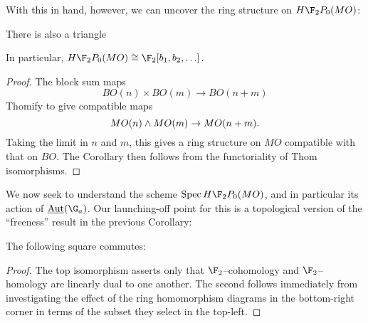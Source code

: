 With this in hand, however, we can uncover the ring structure on $H\F_2P_0(MO)$:
\begin{corollary}\label{HF2MOisFree}
There is also a triangle
\begin{center}
\end{center}
In particular, $H\F_2P_0(MO) \cong \F_2[b_1, b_2, \ldots]$.
\end{corollary}
\begin{proof}
The block sum maps \[BO(n) \times BO(m) \to BO(n+m)\] Thomify to give compatible maps \[MO(n) \wedge MO(m) \to MO(n+m).\]  Taking the limit in $n$ and $m$, this gives a ring structure on $MO$ compatible with that on $BO$.  The Corollary then follows from the functoriality of Thom isomorphisms.
\end{proof}

We now seek to understand the scheme $\Spec H\F_2P_0(MO)$, and in particular its action of $\InternalAut(\G_a)$.  Our launching-off point for this is a topological version of the ``freeness'' result in the previous Corollary:
\begin{lemma}\label{DetectingMORingMapsInHomotopy}
The following square commutes:
\begin{center}
\end{center}
\end{lemma}
\begin{proof}
The top isomorphism asserts only that $\F_2$--cohomology and $\F_2$--homology are linearly dual to one another.  The second follows immediately from investigating the effect of the ring homomorphism diagrams in the bottom-right corner in terms of the subset they select in the top-left.
\end{proof}

